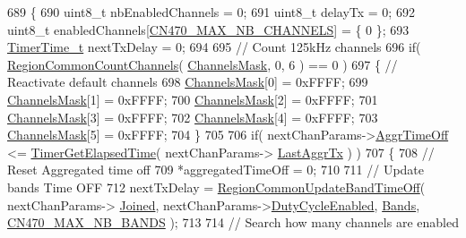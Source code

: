 \begin{DoxyCode}
689 \{
690     uint8\_t nbEnabledChannels = 0;
691     uint8\_t delayTx = 0;
692     uint8\_t enabledChannels[\mbox{\hyperlink{group___r_e_g_i_o_n_c_n470_ga8dd3b552d535062e91b0651705041387}{CN470\_MAX\_NB\_CHANNELS}}] = \{ 0 \};
693     \mbox{\hyperlink{utilities_8h_a4215ca43d3e953099ea758ce428599d0}{TimerTime\_t}} nextTxDelay = 0;
694 
695     \textcolor{comment}{// Count 125kHz channels}
696     \textcolor{keywordflow}{if}( \mbox{\hyperlink{group___r_e_g_i_o_n_c_o_m_m_o_n_gac23f0831812f610f57f42f6cf87368c9}{RegionCommonCountChannels}}( \mbox{\hyperlink{_region_c_n470_8c_a2188957b5ca6af8092154d7ccbfa5757}{ChannelsMask}}, 0, 6 ) == 0 )
697     \{ \textcolor{comment}{// Reactivate default channels}
698         \mbox{\hyperlink{_region_c_n470_8c_a2188957b5ca6af8092154d7ccbfa5757}{ChannelsMask}}[0] = 0xFFFF;
699         \mbox{\hyperlink{_region_c_n470_8c_a2188957b5ca6af8092154d7ccbfa5757}{ChannelsMask}}[1] = 0xFFFF;
700         \mbox{\hyperlink{_region_c_n470_8c_a2188957b5ca6af8092154d7ccbfa5757}{ChannelsMask}}[2] = 0xFFFF;
701         \mbox{\hyperlink{_region_c_n470_8c_a2188957b5ca6af8092154d7ccbfa5757}{ChannelsMask}}[3] = 0xFFFF;
702         \mbox{\hyperlink{_region_c_n470_8c_a2188957b5ca6af8092154d7ccbfa5757}{ChannelsMask}}[4] = 0xFFFF;
703         \mbox{\hyperlink{_region_c_n470_8c_a2188957b5ca6af8092154d7ccbfa5757}{ChannelsMask}}[5] = 0xFFFF;
704     \}
705 
706     \textcolor{keywordflow}{if}( nextChanParams->\mbox{\hyperlink{structs_next_chan_params_a3609676d2d3b7c00e25615324b35cb26}{AggrTimeOff}} <= \mbox{\hyperlink{time_server_8c_a9ca7e27f3d6474daff63f2e093a2e91e}{TimerGetElapsedTime}}( nextChanParams->
      \mbox{\hyperlink{structs_next_chan_params_a381b728f60b185ecf3313e974c18768b}{LastAggrTx}} ) )
707     \{
708         \textcolor{comment}{// Reset Aggregated time off}
709         *aggregatedTimeOff = 0;
710 
711         \textcolor{comment}{// Update bands Time OFF}
712         nextTxDelay = \mbox{\hyperlink{group___r_e_g_i_o_n_c_o_m_m_o_n_ga2e26fe6b49ca26edf7052eadd7f18b3a}{RegionCommonUpdateBandTimeOff}}( nextChanParams->
      \mbox{\hyperlink{structs_next_chan_params_ac2f6caa0f3b02d2ac5056c3ee7c22652}{Joined}}, nextChanParams->\mbox{\hyperlink{structs_next_chan_params_a4d755868e0e80089462286c3ba6a6f18}{DutyCycleEnabled}}, \mbox{\hyperlink{_region_c_n470_8c_a5fa033a12327dde1b783f47403b7d859}{Bands}}, 
      \mbox{\hyperlink{group___r_e_g_i_o_n_c_n470_ga46b33f1d67ef81deefa12018749a22ff}{CN470\_MAX\_NB\_BANDS}} );
713 
714         \textcolor{comment}{// Search how many channels are enabled}

\end{DoxyCode}
